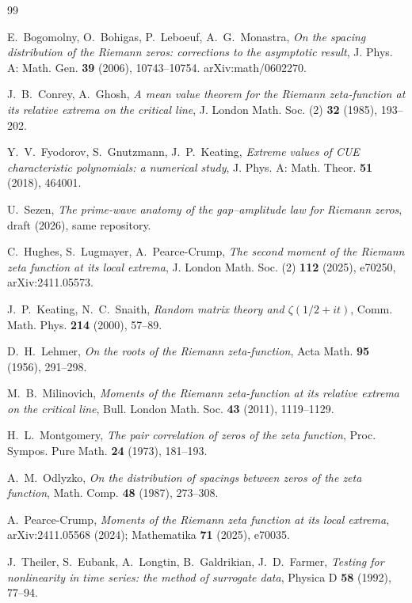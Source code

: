 \documentclass[12pt]{amsart}
\begin{document}
\begin{thebibliography}{99}

 E.~Bogomolny, O.~Bohigas, P.~Leboeuf, A.~G.~Monastra,
\emph{On the spacing distribution of the Riemann zeros: corrections to the
asymptotic result}, J. Phys. A: Math. Gen. \textbf{39} (2006), 10743--10754.
arXiv:math/0602270.

 J.~B.~Conrey, A.~Ghosh, \emph{A mean value theorem for the
Riemann zeta-function at its relative extrema on the critical line},
J. London Math. Soc. (2) \textbf{32} (1985), 193--202.

 Y.~V.~Fyodorov, S.~Gnutzmann, J.~P.~Keating,
\emph{Extreme values of CUE characteristic polynomials: a numerical
study}, J. Phys. A: Math. Theor. \textbf{51} (2018), 464001.

 U.~Sezen, \emph{The prime-wave anatomy of the
gap--amplitude law for Riemann zeros}, draft (2026), same repository.

 C.~Hughes, S.~Lugmayer, A.~Pearce-Crump, \emph{The second
moment of the Riemann zeta function at its local extrema},
J. London Math. Soc. (2) \textbf{112} (2025), e70250, arXiv:2411.05573.

 J.~P.~Keating, N.~C.~Snaith, \emph{Random matrix theory and
$\zeta(1/2+it)$}, Comm. Math. Phys. \textbf{214} (2000), 57--89.

 D.~H.~Lehmer, \emph{On the roots of the Riemann
zeta-function}, Acta Math. \textbf{95} (1956), 291--298.

 M.~B.~Milinovich, \emph{Moments of the Riemann
zeta-function at its relative extrema on the critical line},
Bull. London Math. Soc. \textbf{43} (2011), 1119--1129.

 H.~L.~Montgomery, \emph{The pair correlation of zeros of
the zeta function}, Proc. Sympos. Pure Math. \textbf{24} (1973), 181--193.

 A.~M.~Odlyzko, \emph{On the distribution of spacings
between zeros of the zeta function}, Math. Comp. \textbf{48} (1987),
273--308.

 A.~Pearce-Crump, \emph{Moments of the Riemann zeta function
at its local extrema}, arXiv:2411.05568 (2024); Mathematika \textbf{71}
(2025), e70035.

 J.~Theiler, S.~Eubank, A.~Longtin, B.~Galdrikian,
J.~D.~Farmer, \emph{Testing for nonlinearity in time series: the method of
surrogate data}, Physica D \textbf{58} (1992), 77--94.

\end{thebibliography}
\end{document}
